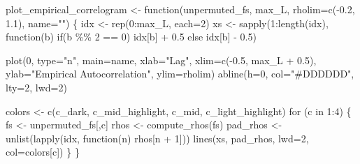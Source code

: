 \documentclass[
  letterpaper,
  DIV=11,
  numbers=noendperiod]{scrartcl}
\newenvironment{Shaded}{\begin{snugshade}}{\end{snugshade}}
\newcommand{\AttributeTok}[1]{\textcolor[rgb]{0.40,0.45,0.13}{#1}}
\newcommand{\ControlFlowTok}[1]{\textcolor[rgb]{0.00,0.23,0.31}{#1}}
\newcommand{\DecValTok}[1]{\textcolor[rgb]{0.68,0.00,0.00}{#1}}
\newcommand{\FloatTok}[1]{\textcolor[rgb]{0.68,0.00,0.00}{#1}}
\newcommand{\FunctionTok}[1]{\textcolor[rgb]{0.28,0.35,0.67}{#1}}
\newcommand{\NormalTok}[1]{\textcolor[rgb]{0.00,0.23,0.31}{#1}}
\newcommand{\OtherTok}[1]{\textcolor[rgb]{0.00,0.23,0.31}{#1}}
\newcommand{\SpecialCharTok}[1]{\textcolor[rgb]{0.37,0.37,0.37}{#1}}
\newcommand{\StringTok}[1]{\textcolor[rgb]{0.13,0.47,0.30}{#1}}
\begin{document}
\begin{Shaded}
\begin{Highlighting}[]
\NormalTok{plot\_empirical\_correlogram }\OtherTok{\textless{}{-}} \ControlFlowTok{function}\NormalTok{(unpermuted\_fs,}
\NormalTok{                                       max\_L,}
                                       \AttributeTok{rholim=}\FunctionTok{c}\NormalTok{(}\SpecialCharTok{{-}}\FloatTok{0.2}\NormalTok{, }\FloatTok{1.1}\NormalTok{),}
                                       \AttributeTok{name=}\StringTok{""}\NormalTok{) \{}
\NormalTok{  idx }\OtherTok{\textless{}{-}} \FunctionTok{rep}\NormalTok{(}\DecValTok{0}\SpecialCharTok{:}\NormalTok{max\_L, }\AttributeTok{each=}\DecValTok{2}\NormalTok{)}
\NormalTok{  xs }\OtherTok{\textless{}{-}} \FunctionTok{sapply}\NormalTok{(}\DecValTok{1}\SpecialCharTok{:}\FunctionTok{length}\NormalTok{(idx), }\ControlFlowTok{function}\NormalTok{(b) }\ControlFlowTok{if}\NormalTok{(b }\SpecialCharTok{\%\%} \DecValTok{2} \SpecialCharTok{==} \DecValTok{0}\NormalTok{) idx[b] }\SpecialCharTok{+} \FloatTok{0.5}
                                          \ControlFlowTok{else}\NormalTok{ idx[b] }\SpecialCharTok{{-}} \FloatTok{0.5}\NormalTok{)}

  \FunctionTok{plot}\NormalTok{(}\DecValTok{0}\NormalTok{, }\AttributeTok{type=}\StringTok{"n"}\NormalTok{, }\AttributeTok{main=}\NormalTok{name,}
       \AttributeTok{xlab=}\StringTok{"Lag"}\NormalTok{, }\AttributeTok{xlim=}\FunctionTok{c}\NormalTok{(}\SpecialCharTok{{-}}\FloatTok{0.5}\NormalTok{, max\_L }\SpecialCharTok{+} \FloatTok{0.5}\NormalTok{),}
       \AttributeTok{ylab=}\StringTok{"Empirical Autocorrelation"}\NormalTok{, }\AttributeTok{ylim=}\NormalTok{rholim)}
  \FunctionTok{abline}\NormalTok{(}\AttributeTok{h=}\DecValTok{0}\NormalTok{, }\AttributeTok{col=}\StringTok{"\#DDDDDD"}\NormalTok{, }\AttributeTok{lty=}\DecValTok{2}\NormalTok{, }\AttributeTok{lwd=}\DecValTok{2}\NormalTok{)}

\NormalTok{  colors }\OtherTok{\textless{}{-}} \FunctionTok{c}\NormalTok{(c\_dark, c\_mid\_highlight, c\_mid, c\_light\_highlight)}
  \ControlFlowTok{for}\NormalTok{ (c }\ControlFlowTok{in} \DecValTok{1}\SpecialCharTok{:}\DecValTok{4}\NormalTok{) \{}
\NormalTok{    fs }\OtherTok{\textless{}{-}}\NormalTok{ unpermuted\_fs[,c]}
\NormalTok{    rhos }\OtherTok{\textless{}{-}} \FunctionTok{compute\_rhos}\NormalTok{(fs)}
\NormalTok{    pad\_rhos }\OtherTok{\textless{}{-}} \FunctionTok{unlist}\NormalTok{(}\FunctionTok{lapply}\NormalTok{(idx, }\ControlFlowTok{function}\NormalTok{(n) rhos[n }\SpecialCharTok{+} \DecValTok{1}\NormalTok{]))}
    \FunctionTok{lines}\NormalTok{(xs, pad\_rhos, }\AttributeTok{lwd=}\DecValTok{2}\NormalTok{, }\AttributeTok{col=}\NormalTok{colors[c])}
\NormalTok{  \}}
\NormalTok{\}}
\end{Highlighting}
\end{Shaded}
\end{document}
